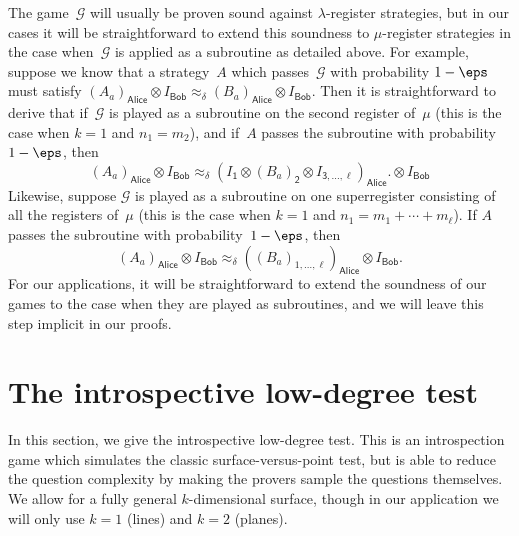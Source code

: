 \documentclass[11pt]{article}
\newcommand{\game}{\mathscr{G}}
\newcommand{\reg}[1]{{\mathsf{#1}}}
\begin{document}
The game~$\game$ will usually be proven sound against $\lambda$-register strategies,
but in our cases it will be straightforward to extend this soundness to $\mu$-register strategies
in the case when~$\game$ is applied as a subroutine as detailed above.
For example, suppose we know that a strategy~$A$ which passes~$\game$
with probability $1-\eps$ must satisfy
$(A_a)_{\reg{Alice}} \otimes I_{\reg{Bob}} \approx_{\delta} (B_a)_{\reg{Alice}} \otimes I_{\reg{Bob}}$.
Then it is straightforward to derive that if~$\game$ is played as a subroutine on the second register of~$\mu$
(this is the case when $k = 1$ and $n_1 = m_2$), and if~$A$ passes the subroutine with probability~$1-\eps$, then
\begin{equation*}
(A_a)_{\reg{Alice}} \otimes I_{\reg{Bob}} \approx_{\delta} (I_{\reg{1}} \otimes (B_a)_{\reg{2}} \otimes I_{\reg{3, \ldots, \ell}})_{\reg{Alice}}.\otimes I_{\reg{Bob}}
\end{equation*}
Likewise, suppose $\game$ is played as a subroutine on one superregister consisting of all the registers of~$\mu$
(this is the case when $k = 1$ and $n_1 = m_1 + \cdots + m_\ell$).
If $A$ passes the subroutine with probability~$1-\eps$, then
\begin{equation*}
(A_a)_{\reg{Alice}} \otimes I_{\reg{Bob}} \approx_{\delta} ((B_a)_{1, \ldots,\ell} )_{\reg{Alice}} \otimes I_{\reg{Bob}}.
\end{equation*}
For our applications, it will be straightforward to
extend the soundness of our games to the case when they are played as subroutines,
and we will leave this step implicit in our proofs.



\section{The introspective low-degree test}\label{sec:big-degree}

In this section, we give the introspective low-degree test.
This is an introspection game which simulates the classic surface-versus-point test,
but is able to reduce the question complexity by making the provers sample the questions themselves.
We allow for a fully general $k$-dimensional surface,
though in our application we will only use $k = 1$ (lines) and $k=2$ (planes).
\end{document}
